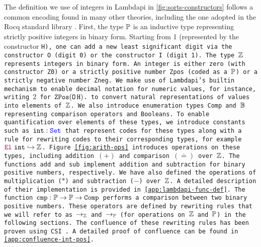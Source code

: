 The definition we use of integers in Lambdapi in \cref{fig:sorts-constructors} follows a common encoding found in many other theories, including the one adopted in the Rocq standard library \cite{Rocq-refman}.
First, the type $\mathbb{P}$  is an inductive type representing strictly positive integers in binary form.
Starting from 1 (represented by the constructor \tt{H}), one can add a new least significant digit via the constructor \tt{O} (digit 0) or the constructor \tt{I} (digit 1). 
The type $\mathbb{Z}$ represents integers in binary form.
An integer is either zero (with constructor \tt{Z0}) or a strictly positive number \tt{Zpos} (coded as a $\mathbb{P}$) or a strictly negative number \tt{Zneg}.
We make use of Lambdapi's \lstinline[language=Lambdapi,basicstyle=\ttfamily\footnotesize]|builtin| mechanism to enable decimal notation for numeric values, for instance, writing $2$ for $\mathop{\texttt{ZPos}} (\mathop{\texttt{O}} \texttt{H})$.
to convert natural representations of values into elements of $\mathbb{Z}$.
%
We also introduce enumeration types \tt{Comp} and $\mathbb{B}$ representing comparison operators and Booleans. 
%
To enable quantification over elements of these types, we introduce constants such as $\texttt{int}: \textcolor{blue}{\texttt{\upshape{Set}}}$ that represent codes for these types along with a rule for rewriting codes to their corresponding types, for example $\textcolor{purple}{\mathop{\texttt{\upshape{El}}}}~\texttt{int} \hookrightarrow \mathbb{Z}$.
Figure~\ref{fig:arith-ops} introduces operations on these types, including addition $(+)$ and comparison $(\doteq)$ over $\mathbb{Z}$. The functions \texttt{add} and \texttt{sub} implement addition and subtraction for binary positive numbers, respectively.
We have also defined the operations of multiplication ($\mathbin{*}$) and subtraction ($\mathbin{-}$) over $\mathbb{Z}$. A detailed description of their implementation is provided in \cref{app:lambdapi-func-def}.
The function $\texttt{cmp}: \mathbb{P} \to \mathbb{P} \to \texttt{Comp}$ performs a comparison between two binary positive numbers. 
These operators are defined by rewriting rules that we will refer to as $\rightarrow_\mathbb{Z}$ and $\rightarrow_\mathbb{P}$ (for operations on $\mathbb{Z}$ and $\mathbb{P}$) in the following sections.
The confluence of these rewriting rules has been proven using CSI \cite{CSI}. A detailed proof of confluence can be found in \cref{app:confluence-int-pos}.

